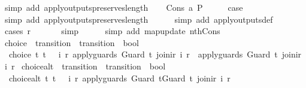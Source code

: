\begin{isabellebody}
\ {\isacharparenleft}simp\ add{\isacharcolon}\ apply{\isacharunderscore}outputs{\isacharunderscore}preserves{\isacharunderscore}length{\isacharparenright}\isanewline
{}\isamarkupfalse%
\isanewline
\ \ \isamarkupfalse%
\ {\isacharparenleft}Cons\ a\ P{\isacharparenright}\isanewline
\ \ \isamarkupfalse%
\ \isamarkupfalse%
\ {\isacharquery}case\isanewline
\ \ \ \ \isamarkupfalse%
\ {\isacharparenleft}simp\ add{\isacharcolon}\ apply{\isacharunderscore}outputs{\isacharunderscore}preserves{\isacharunderscore}length{\isacharparenright}\isanewline
\ \ \ \ \isamarkupfalse%
\ {\isacharparenleft}simp\ add{\isacharcolon}\ apply{\isacharunderscore}outputs{\isacharunderscore}def{\isacharparenright}\isanewline
\ \ \ \ \isamarkupfalse%
\ {\isacharparenleft}cases\ r{\isacharparenright}\isanewline
\ \ \ \ \ \isamarkupfalse%
\ simp\isanewline
\ \ \ \ \isamarkupfalse%
\ {\isacharparenleft}simp\ add{\isacharcolon}\ map{\isacharunderscore}update\ nth{\isacharunderscore}Cons{\isacharprime}{\isacharparenright}\isanewline
{}\isamarkupfalse%
%
\endisatagproof
{\isafoldproof}%
%
\isadelimproof
\isanewline
%
\endisadelimproof
\isanewline
{}\isamarkupfalse%
\ choice\ {\isacharcolon}{\isacharcolon}\ {\isachardoublequoteopen}transition\ {\isasymRightarrow}\ transition\ {\isasymRightarrow}\ bool{\isachardoublequoteclose}\ \isanewline
\ \ {\isachardoublequoteopen}choice\ t\ t{\isacharprime}\ {\isacharequal}\ {\isacharparenleft}{\isasymexists}\ i\ r{\isachardot}\ apply{\isacharunderscore}guards\ {\isacharparenleft}Guard\ t{\isacharparenright}\ {\isacharparenleft}join{\isacharunderscore}ir\ i\ r{\isacharparenright}\ {\isasymand}\ apply{\isacharunderscore}guards\ {\isacharparenleft}Guard\ t{\isacharprime}{\isacharparenright}\ {\isacharparenleft}join{\isacharunderscore}ir\ i\ r{\isacharparenright}{\isacharparenright}{\isachardoublequoteclose}\isanewline
\isanewline
{}\isamarkupfalse%
\ choice{\isacharunderscore}alt\ {\isacharcolon}{\isacharcolon}\ {\isachardoublequoteopen}transition\ {\isasymRightarrow}\ transition\ {\isasymRightarrow}\ bool{\isachardoublequoteclose}\ \isanewline
\ \ {\isachardoublequoteopen}choice{\isacharunderscore}alt\ t\ t{\isacharprime}\ {\isacharequal}\ {\isacharparenleft}{\isasymexists}\ i\ r{\isachardot}\ apply{\isacharunderscore}guards\ {\isacharparenleft}Guard\ t{\isacharat}Guard\ t{\isacharprime}{\isacharparenright}\ {\isacharparenleft}join{\isacharunderscore}ir\ i\ r{\isacharparenright}{\isacharparenright}{\isachardoublequoteclose}\isanewline

\end{isabellebody}
